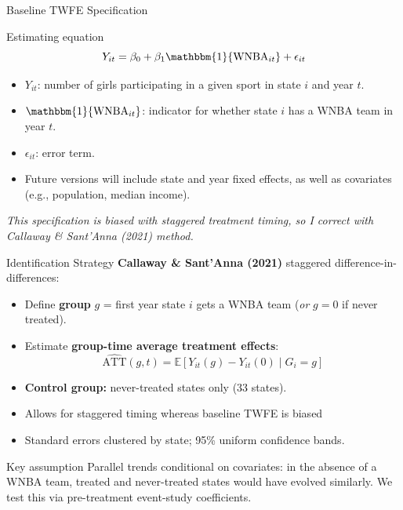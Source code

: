 \documentclass[aspectratio=169, 12pt]{beamer}
\newcommand{\attg}{\widehat{\mathrm{ATT}}(g,t)}
\begin{document}
\begin{frame}{Baseline TWFE Specification}
  \begin{block}{Estimating equation}
    \small
    \[
      Y_{it} = \beta_0 + \beta_1 \mathbbm{1}\{\text{WNBA}_{it}\} + \epsilon_{it}
    \]
  \end{block}
  \begin{itemize}
    \item $Y_{it}$: number of girls participating in a given sport in state $i$ and year $t$.
    \item $\mathbbm{1}\{\text{WNBA}_{it}\}$: indicator for whether state $i$ has a WNBA team in year $t$.
    \item $\epsilon_{it}$: error term.
    \item Future versions will include state and year fixed effects, as well as covariates (e.g., population, median income).
  \end{itemize}
  \textit{This specification is biased with staggered treatment timing, so I correct with Callaway \& Sant'Anna (2021) method.}
  
\end{frame}


\begin{frame}{Identification Strategy}
  \textbf{Callaway \& Sant'Anna (2021)} staggered difference-in-differences:

  \vspace{0.6em}
  \begin{itemize}
    \item Define \textbf{group} $g$ = first year state $i$ gets a WNBA team (\textit{or} $g = 0$ if never treated).
    \vspace{0.4em}
    \item Estimate \textbf{group-time average treatment effects}:
      \[
        \attg = \mathbb{E}[Y_{it}(g) - Y_{it}(0) \mid G_i = g]
      \]
    \item \textbf{Control group:} never-treated states only (33 states).
    \item Allows for staggered timing whereas baseline TWFE is biased
    \item Standard errors clustered by state; 95\% uniform confidence bands.
  \end{itemize}

  \vspace{0.6em}
  \begin{block}{Key assumption}
    \small Parallel trends conditional on covariates: in the absence of a WNBA team, treated and never-treated states would have evolved similarly. We test this via pre-treatment event-study coefficients.
  \end{block}
\end{frame}
\end{document}
